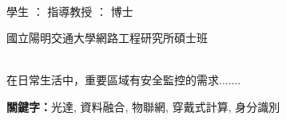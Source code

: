 
  \begin{center}
	\large
    \begin{singlespace}    
      \textbf{\chineseTitle{}} \\[0.5cm]
    \end{singlespace}
    
    \begin{singlespace}    

    	學生      ：\studentCnName{}  \hspace{2.5cm}  指導教授  ：\advisorCnName \hspace{0.1cm} 博士 \\
         [0.5cm]

    \end{singlespace}
    

    國立陽明交通大學網路工程研究所碩士班 \\[0.5cm]
     \\[0.5cm]
    	
  \end{center}
  \normalsize 
  \hspace{0.75cm} 在日常生活中，重要區域有安全監控的需求.......

  \vspace{1cm}

  \textbf{關鍵字：}光達, 資料融合, 物聯網, 穿戴式計算, 身分識別
